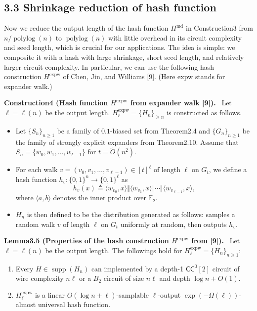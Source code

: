 \documentclass[10pt,a4paper]{article}
\newenvironment{authorclaim}[1]{\par\medskip\noindent\textbf{#1.}\ }{\par\medskip}
\begin{document}
\subsection*{3.3 Shrinkage reduction of hash function}
Now we reduce the output length of the hash function $H^{\mathrm{md}}$ in Construction3 from $n/\operatorname{polylog}(n)$ to $\operatorname{polylog}(n)$ with little overhead in its circuit complexity and seed length, which is crucial for our applications. The idea is simple: we composite it with a hash with large shrinkage, short seed length, and relatively larger circuit complexity. In particular, we can use the following hash construction $H^{\mathrm{expw}}$ of Chen, Jin, and Williams [9]. (Here expw stands for expander walk.)
\begin{authorclaim}{Construction4 (Hash function $H^{\mathrm{expw}}$ from expander walk [9])}
Let $\ell=\ell(n)$ be the output length. $H^{\mathrm{expw}}_\ell=\{H_n\}_{\ge n}$ is constructed as follows.
\begin{itemize}
\item Let $\{S_n\}_{n\ge1}$ be a family of $0.1$-biased set from Theorem2.4 and $\{G_n\}_{n\ge1}$ be the family of strongly explicit expanders from Theorem2.10. Assume that $S_n=\{w_0,w_1,\ldots,w_{t-1}\}$ for $t=\widetilde O(n^2)$.
\item For each walk $v=(v_0,v_1,\ldots,v_{\ell-1})\in[t]^\ell$ of length $\ell$ on $G_t$, we define a hash function $h_v:\{0,1\}^n\to\{0,1\}^\ell$ as
\[h_v(x)\triangleq\langle w_{v_0},x\rangle\Vert\langle w_{v_1},x\rangle\Vert\cdots\Vert\langle w_{v_{\ell-1}},x\rangle,\]
where $\langle a,b\rangle$ denotes the inner product over $\mathbb F_2$.
\item $H_n$ is then defined to be the distribution generated as follows: samples a random walk $v$ of length $\ell$ on $G_t$ uniformly at random, then outputs $h_v$.
\end{itemize}
\end{authorclaim}
\begin{authorclaim}{Lemma3.5 (Properties of the hash construction $H^{\mathrm{expw}}$ from [9])}
Let $\ell=\ell(n)$ be the output length. The followings hold for $H^{\mathrm{expw}}_\ell=\{H_n\}_{n\ge1}$:
\begin{enumerate}
\item Every $H\in\operatorname{supp}(H_n)$ can implemented by a depth-1 $\mathsf{CC}^0[2]$ circuit of wire complexity $n\ell$ or a $B_2$ circuit of size $n\ell$ and depth $\log n+O(1)$.
\item $H^{\mathrm{expw}}_\ell$ is a linear $O(\log n+\ell)$-samplable $\ell$-output $\exp(-\Omega(\ell))$-almost universal hash function.
\end{enumerate}
\end{authorclaim}
\end{document}

